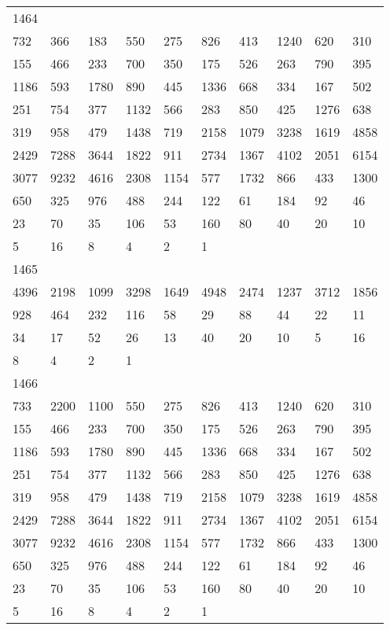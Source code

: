 \begin{longtable}{*{10}{l}}
1464&&&&&&&&&\\
732& 366& 183& 550& 275& 826& 413& 1240& 620& 310\\
155& 466& 233& 700& 350& 175& 526& 263& 790& 395\\
1186& 593& 1780& 890& 445& 1336& 668& 334& 167& 502\\
251& 754& 377& 1132& 566& 283& 850& 425& 1276& 638\\
319& 958& 479& 1438& 719& 2158& 1079& 3238& 1619& 4858\\
2429& 7288& 3644& 1822& 911& 2734& 1367& 4102& 2051& 6154\\
3077& 9232& 4616& 2308& 1154& 577& 1732& 866& 433& 1300\\
650& 325& 976& 488& 244& 122& 61& 184& 92& 46\\
23& 70& 35& 106& 53& 160& 80& 40& 20& 10\\
5& 16& 8& 4& 2& 1& \\

1465&&&&&&&&&\\
4396& 2198& 1099& 3298& 1649& 4948& 2474& 1237& 3712& 1856\\
928& 464& 232& 116& 58& 29& 88& 44& 22& 11\\
34& 17& 52& 26& 13& 40& 20& 10& 5& 16\\
8& 4& 2& 1& \\

1466&&&&&&&&&\\
733& 2200& 1100& 550& 275& 826& 413& 1240& 620& 310\\
155& 466& 233& 700& 350& 175& 526& 263& 790& 395\\
1186& 593& 1780& 890& 445& 1336& 668& 334& 167& 502\\
251& 754& 377& 1132& 566& 283& 850& 425& 1276& 638\\
319& 958& 479& 1438& 719& 2158& 1079& 3238& 1619& 4858\\
2429& 7288& 3644& 1822& 911& 2734& 1367& 4102& 2051& 6154\\
3077& 9232& 4616& 2308& 1154& 577& 1732& 866& 433& 1300\\
650& 325& 976& 488& 244& 122& 61& 184& 92& 46\\
23& 70& 35& 106& 53& 160& 80& 40& 20& 10\\
5& 16& 8& 4& 2& 1& \\


\end{longtable}
